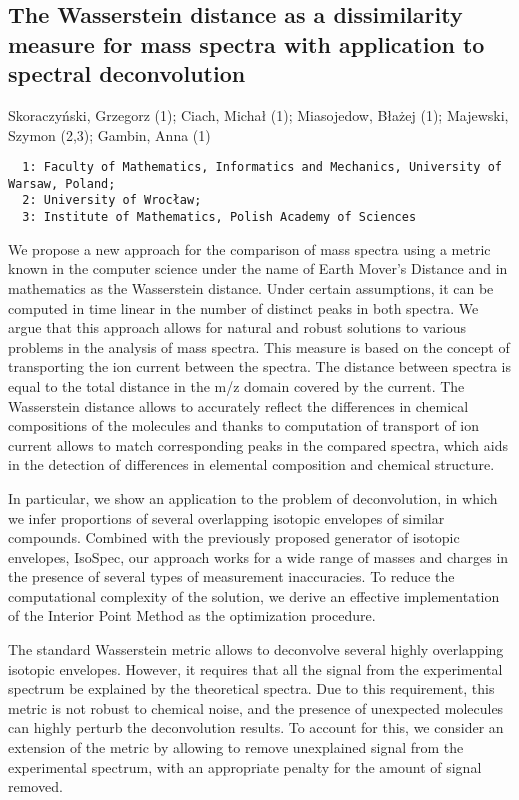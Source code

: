 {\subsection*{\color{eubicRed} The Wasserstein distance as a dissimilarity measure for mass spectra with application to spectral deconvolution}
{\color{eubicGray}Skoraczyński, Grzegorz (1);
Ciach, Michał (1);
Miasojedow, Błażej (1);
Majewski, Szymon (2,3);
Gambin, Anna (1)}
{\color{eubicGray}\begin{verbatim}
  1: Faculty of Mathematics, Informatics and Mechanics, University of Warsaw, Poland;
  2: University of Wrocław;
  3: Institute of Mathematics, Polish Academy of Sciences
\end{verbatim}}

We propose a new approach for the comparison of mass spectra using a metric
known in the computer science under the name of Earth Mover’s Distance and in
mathematics as the Wasserstein distance. Under certain assumptions, it can be
computed in time linear in the number of distinct peaks in both spectra. We
argue that this approach allows for natural and robust solutions to various
problems in the analysis of mass spectra. This measure is based on the concept
of transporting the ion current between the spectra. The distance between
spectra is equal to the total distance in the m/z domain covered by the
current. The Wasserstein distance allows to accurately reflect the differences
in chemical compositions of the molecules and thanks to computation of
transport of ion current allows to match corresponding peaks in the compared
spectra, which aids in the detection of differences in elemental composition
and chemical structure.

In particular, we show an application to the problem of deconvolution, in which
we infer proportions of several overlapping isotopic envelopes of similar
compounds. Combined with the previously proposed generator of isotopic
envelopes, IsoSpec, our approach works for a wide range of masses and charges
in the presence of several types of measurement inaccuracies. To reduce the
computational complexity of the solution, we derive an effective implementation
of the Interior Point Method as the optimization procedure.

The standard Wasserstein metric allows to deconvolve several highly overlapping
isotopic envelopes. However, it requires that all the signal from the
experimental spectrum be explained by the theoretical spectra. Due to this
requirement, this metric is not robust to chemical noise, and the presence of
unexpected molecules can highly perturb the deconvolution results. To account
for this, we consider an extension of the metric by allowing to remove
unexplained signal from the experimental spectrum, with an appropriate penalty
for the amount of signal removed.

}
